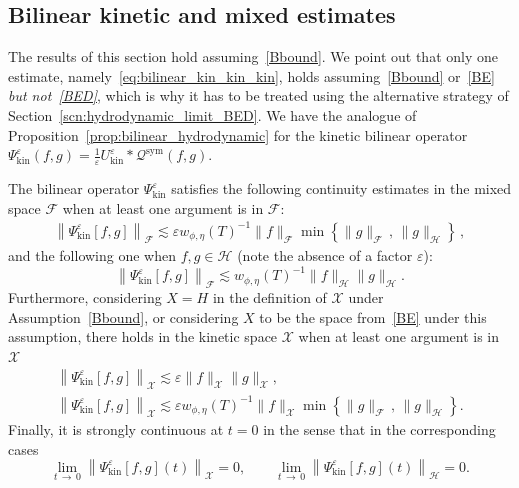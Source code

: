 \documentclass[AHL,Unicode,longabstracts,published]{cedram}
\newcommand{\kin}{\mathrm{kin}}
\newcommand{\sym}{\mathrm{sym}}
\newcommand{\XX}{\mathcal{X}}
\newcommand{\HH}{\mathcal{H}}
\newcommand{\QQ}{\mathcal{Q}}
\newcommand{\FFF}{\mathscr{F}}
\newcommand{\HHH}{\mathscr{H}}
\newcommand{\GGG}{\mathscr{X}}
\newcommand{\Ss}{H}
\newcommand{\SSs}{\HH}
\newcommand{\SSSs}{\HHH}
\newcommand{\Sl}{X}
\newcommand{\SSl}{\XX}
\newcommand{\SSSl}{\GGG}
\newcommand{\SSSm}{\FFF}
\newcommand*\eps{{\varepsilon}}
\begin{document}
\subsection{Bilinear kinetic and mixed estimates}

The results of this section hold assuming~\eqref{Bbound}. We point out that only one estimate, namely~\eqref{eq:bilinear_kin_kin_kin}, holds assuming~\eqref{Bbound} or~\eqref{BE} \emph{but not~\ref{BED}}, which is why it has to be treated using the alternative strategy of Section~\ref{scn:hydrodynamic_limit_BED}. We have the analogue of Proposition~\ref{prop:bilinear_hydrodynamic} for the kinetic bilinear operator $\Psi^\eps_\kin(f, g) = \frac{1}{\eps} U^\eps_\kin \ast \QQ^\sym(f, g)$.

\begin{prop}\label{prop:bilinear_kinetic}
The bilinear operator $\Psi^\eps_\kin$ satisfies the following continuity estimates in the mixed space $\SSSm$ when at least one argument is in $\SSSm$:
\begin{gather}\label{eq:bilinear_mix_mix_mix}
\left\| \Psi^\eps_\kin [f, g] \right\|_\SSSm \lesssim \eps w_{\phi, \eta}(T)^{-1} \| f \|_\SSSm \min\left\{\| g \|_\SSSm\,,\,\| g \|_\SSSs\right\}\,,
\end{gather}
and the following one when $f, g \in \SSSs$ (note the absence of a factor $\eps$):
\begin{equation}\label{eq:bilinear_mix_hyd_hyd}
\left\| \Psi^\eps_\kin [f, g]\right\|_\SSSm \lesssim w_{\phi, \eta}(T)^{-1} \| f \|_\SSSs \| g \|_\SSSs.
\end{equation}
Furthermore, considering $\Sl = \Ss$ in the definition of $\SSSl$ under Assumption~\eqref{Bbound}, or considering $\Sl$ to be the space from~\eqref{BE} under this assumption, there holds in the kinetic space $\SSSl$ when at least one argument is in $\SSSl$
\begin{subequations}\label{eq:bilinear_kin}
\begin{gather}
\left\| \Psi^\eps_\kin [f, g] \right\|_\SSSl \lesssim \eps \| f \|_\SSSl \| g \|_\SSSl,\label{eq:bilinear_kin_kin_kin}\\
\left\| \Psi^\eps_\kin [f, g] \right\|_\SSSl \lesssim \eps w_{\phi, \eta}(T)^{-1} \| f \|_\SSSl \min\left\{ \| g \|_\SSSm\,,\,\| g \|_\SSSs\right\}.\label{eq:bilinear_kin_kin_mix}
\end{gather}
\end{subequations}
Finally, it is strongly continuous at $t = 0$ in the sense that in the corresponding cases
\[
\lim_{t\,\to\,0}\left\| \Psi^\eps_\kin [f, g](t)\right\|_\SSl= 0, \qquad \lim_{t\,\to\,0}\left\| \Psi^\eps_\kin [f, g](t) \right\|_\SSs = 0.
\]
\end{prop}
\end{document}
